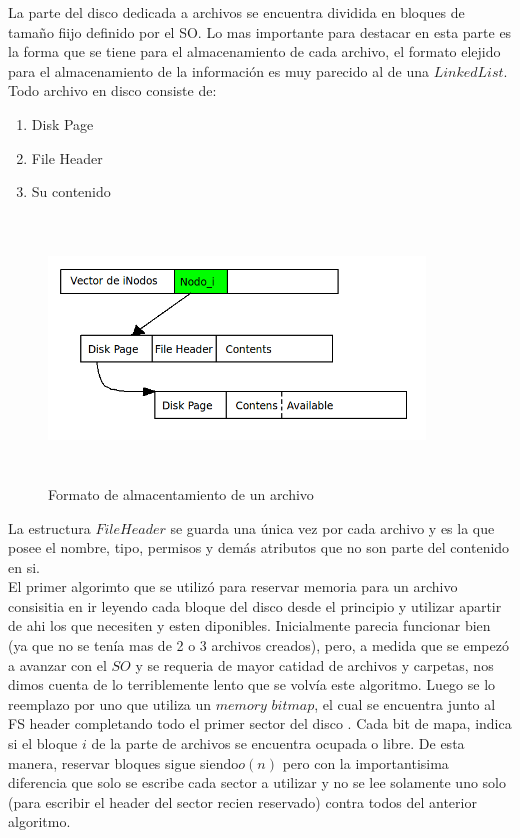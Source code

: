 \documentclass[english]{article}
\begin{document}
La parte del disco dedicada a archivos se encuentra dividida en bloques
de tamaño fiijo definido por el SO. Lo mas importante para destacar
en esta parte es la forma que se tiene para el almacenamiento de cada
archivo, el formato elejido para el almacenamiento de la información
es muy parecido al de una $LinkedList$. Todo archivo en disco consiste
de:
\begin{enumerate}
\item Disk Page
\item File Header
\item Su contenido
\end{enumerate}
\begin{figure}[H]
\includegraphics[width=10cm,height=7cm,keepaspectratio]{Archivo}

\caption{Formato de almacentamiento de un archivo}


\end{figure}


La estructura $File$$Header$ se guarda una única vez por cada archivo
y es la que posee el nombre, tipo, permisos y demás atributos que
no son parte del contenido en si.\\


El primer algorimto que se utilizó para reservar memoria para un archivo
consisitia en ir leyendo cada bloque del disco desde el principio
y utilizar apartir de ahi los que necesiten y esten diponibles. Inicialmente
parecia funcionar bien (ya que no se tenía mas de 2 o 3 archivos creados),
pero, a medida que se empezó a avanzar con el $SO$ y se requeria
de mayor catidad de archivos y carpetas, nos dimos cuenta de lo terriblemente
lento que se volvía este algoritmo. Luego se lo reemplazo por uno
que utiliza un $memory$ $bitmap$, el cual se encuentra junto al
FS header completando todo el primer sector del disco . Cada bit de
mapa, indica si el bloque $i$ de la parte de archivos se encuentra
ocupada o libre. De esta manera, reservar bloques sigue siendo$o(n)$
pero con la importantisima diferencia que solo se escribe cada sector
a utilizar y no se lee solamente uno solo (para escribir el header
del sector recien reservado) contra todos del anterior algoritmo.
\end{document}
